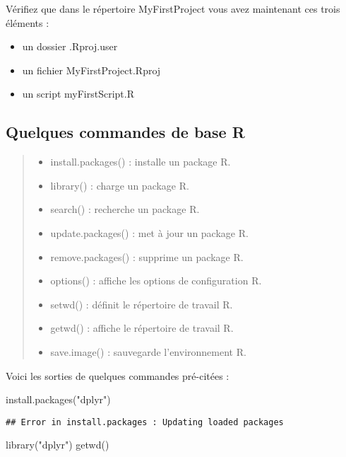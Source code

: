 \documentclass[
]{article}
\newenvironment{Shaded}{\begin{snugshade}}{\end{snugshade}}
\newcommand{\FunctionTok}[1]{\textcolor[rgb]{0.00,0.00,0.00}{#1}}
\newcommand{\NormalTok}[1]{#1}
\newcommand{\StringTok}[1]{\textcolor[rgb]{0.31,0.60,0.02}{#1}}
\providecommand{\tightlist}{%
  \setlength{\itemsep}{0pt}\setlength{\parskip}{0pt}}
\begin{document}
Vérifiez que dans le répertoire MyFirstProject vous avez maintenant ces trois éléments :

\begin{itemize}
\tightlist
\item
  un dossier .Rproj.user
\item
  un fichier MyFirstProject.Rproj
\item
  un script myFirstScript.R
\end{itemize}

\hypertarget{quelques-commandes-de-base-r}{%
\subsection{Quelques commandes de base R}\label{quelques-commandes-de-base-r}}

\begin{quote}
\begin{itemize}
\tightlist
\item
  install.packages() : installe un package R.
\item
  library() : charge un package R.
\item
  search() : recherche un package R.
\item
  update.packages() : met à jour un package R.
\item
  remove.packages() : supprime un package R.
\item
  options() : affiche les options de configuration R.
\item
  setwd() : définit le répertoire de travail R.
\item
  getwd() : affiche le répertoire de travail R.
\item
  save.image() : sauvegarde l'environnement R.
\end{itemize}
\end{quote}

Voici les sorties de quelques commandes pré-citées :

\begin{Shaded}
\begin{Highlighting}[]
\FunctionTok{install.packages}\NormalTok{(}\StringTok{"dplyr"}\NormalTok{)}
\end{Highlighting}
\end{Shaded}

\begin{verbatim}
## Error in install.packages : Updating loaded packages
\end{verbatim}

\begin{Shaded}
\begin{Highlighting}[]
\FunctionTok{library}\NormalTok{(}\StringTok{"dplyr"}\NormalTok{)}
\FunctionTok{getwd}\NormalTok{()}
\end{Highlighting}
\end{Shaded}
\end{document}

